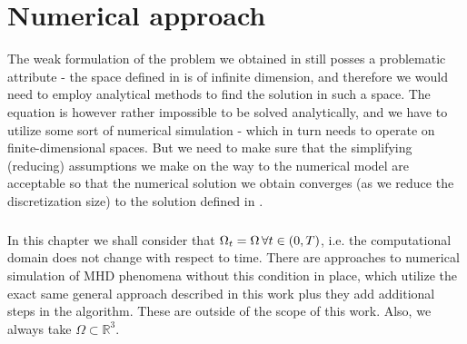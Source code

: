 \chapter{Numerical approach}
The weak formulation of the problem we obtained in  still posses a problematic attribute - the space defined in  is of infinite dimension, and therefore we would need to employ analytical methods to find the solution  in such a space. The equation  is however rather impossible to be solved analytically, and we have to utilize some sort of numerical simulation - which in turn needs to operate on finite-dimensional spaces. But we need to make sure that the simplifying (reducing) assumptions we make on the way to the numerical model are acceptable so that the numerical solution we obtain converges (as we reduce the discretization size) to the solution defined in .

\paragraph{}
In this chapter we shall consider that $\Omega_t = \Omega\, \forall t \in \left( 0, T\right) $, i.e. the computational domain does not change with respect to time. There are approaches to numerical simulation of MHD phenomena without this condition in place, which utilize the exact same general approach described in this work plus they add additional steps in the algorithm. These are outside of the scope of this work. Also, we always take $\Omega \subset \mathbb{R}^3$.




















